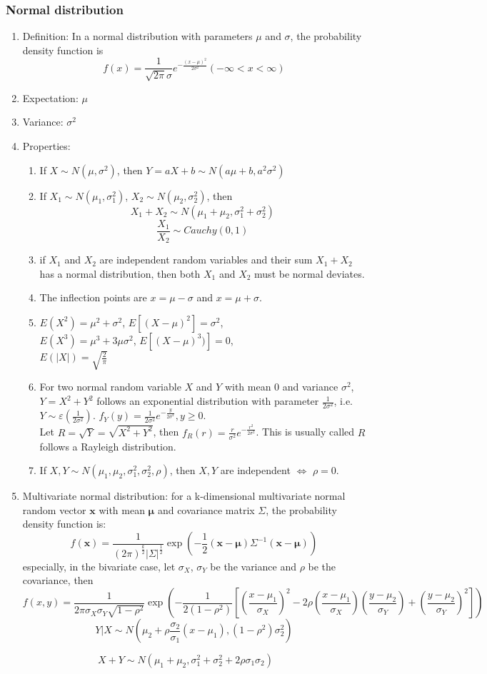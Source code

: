 \documentclass[a4paper]{article}
\begin{document}
	\subsubsection{Normal distribution}
		\begin{enumerate}
		\item Definition: In a normal distribution with parameters $\mu$ and $\sigma$, the probability density function is 
$$f(x)=\frac{1}{\sqrt{2\pi}\sigma}e^{-\frac{(x-\mu)^2}{2\sigma^2}}(-\infty<x<\infty)$$
		\item Expectation: $\mu$
		\item Variance:	$\sigma^2$
		\item Properties:
			\begin{enumerate}
			\item If $X\sim N(\mu, \sigma^2)$, then $Y=aX+b\sim N(a\mu+b,a^2\sigma^2)$
			\item If $X_1\sim N(\mu_1,\sigma_1^2)$, $X_2\sim N(\mu_2,\sigma_2^2)$, then 
$$X_1+X_2\sim N(\mu_1+\mu_2,\sigma_1^2+\sigma_2^2)$$
$$\frac{X_1}{X_2}\sim Cauchy(0,1)$$
			\item if $X_1$ and $X_2$ are independent random variables and their sum $X_1+X_2$ has a normal distribution, then both $X_1$ and $X_2$ must be normal deviates.
			\item The inflection points are $x=\mu-\sigma$ and $x=\mu+\sigma$.
			\item $E(X^2)=\mu^2+\sigma^2$, $E[(X-\mu)^2]=\sigma^2$,\\$E(X^3)=\mu^3+3\mu \sigma^2$, $E[(X-\mu)^3)]=0$,\\$E(|X|)=\sqrt{\frac{2}{\pi}}$
			\item For two normal random variable $X$ and $Y$ with mean $0$ and variance $\sigma^2$, $Y=X^2+Y^2$ follows an exponential distribution with parameter $
\frac{1}{2\sigma^2}$, i.e. $Y\sim\varepsilon(\frac{1}{2\sigma^2})$. $f_Y(y)=\frac{1}{2\sigma^2}e^{-\frac{y}{2\sigma^2}},y\geq0$.\\
Let $R=\sqrt{Y}=\sqrt{X^2+Y^2}$, then $f_R(r)=\frac{r}{\sigma^2}e^{-\frac{r^2}{2\sigma^2}}$. This is usually called $R$ follows a Rayleigh distribution.
			\item If $X,Y\sim N(\mu_1,\mu_2,\sigma_1^2,\sigma_2^2,\rho)$, then $X,Y$ are independent $\Leftrightarrow$ $\rho=0$.
			\end{enumerate}
		
		\item Multivariate normal distribution: for a k-dimensional multivariate normal random vector $\mathbf{x}$ with mean $\mathbf{\mu}$ and covariance matrix $\Sigma$, the probability density function is: 
$$f(\mathbf{x})=\frac{1}{(2\pi)^\frac{k}{2}|\Sigma|^\frac{1}{2}}\exp\left(-\frac{1}{2}(\mathbf{x}-\mathbf{\mu})\Sigma^{-1}(\mathbf{x}-\mathbf{\mu})\right)$$
especially, in the bivariate case, let $\sigma_X$, $\sigma_Y$ be the variance and $\rho$ be the covariance, then
$$f(x,y)=\frac{1}{2\pi\sigma_X\sigma_Y\sqrt{1-\rho^2}}\exp\left(-\frac{1}{2(1-\rho^2)}\left[(\frac{x-\mu_1}{\sigma_X})^2-2\rho(\frac{x-\mu_1}{\sigma_X})(\frac{y-\mu_2}{\sigma_Y})+(\frac{y-\mu_2}{\sigma_Y})^2\right]\right)$$
$$Y|X\sim N(\mu_2+\rho\frac{\sigma_2}{\sigma_1}(x-\mu_1),(1-\rho^2)\sigma_2^2)$$
		\end{enumerate}
$$X+Y\sim N(\mu_1+\mu_2,\sigma_1^2+\sigma_2^2+2\rho\sigma_1\sigma_2)$$
\end{document}
